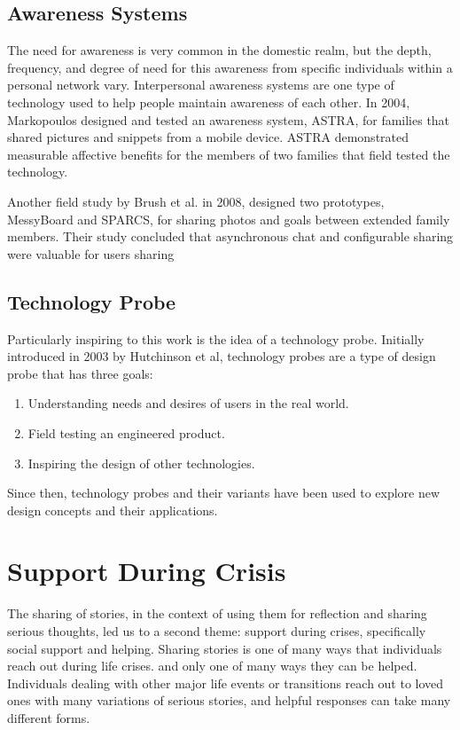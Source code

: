   \subsection{Awareness Systems}
    The need for awareness is very common in the domestic realm,
    but the depth, frequency, and degree of need for this awareness from specific individuals
    within a personal network vary.
    \cite{neustaedter06}
    Interpersonal awareness systems are one type of technology used to
    help people maintain awareness of each other.
    In 2004, Markopoulos designed and tested an
    awareness system, ASTRA, for families that shared pictures and snippets from a mobile
    device.
    \cite{markopoulos04}
    ASTRA demonstrated measurable affective benefits for the members of
    two families that field tested the technology.

    Another field study by Brush et al. in 2008,
    designed two prototypes, MessyBoard and SPARCS,
    for sharing photos and goals between extended family members.
    \cite{brush_08}
    Their study concluded that asynchronous chat and configurable sharing were
    valuable for users sharing 

  \subsection{Technology Probe}
    Particularly inspiring to this work is the idea of a technology probe.
    Initially introduced in 2003 by Hutchinson et al,
    technology probes are a type of design probe that has three goals:
    \begin{enumerate}
    \item Understanding needs and desires of users in the real world.
    \item Field testing an engineered product.
    \item Inspiring the design of other technologies.
    \end{enumerate}

    Since then, technology probes and their variants have been used to explore
    new design concepts and their applications. \cite{vetere05, lottridge09}

\section{Support During Crisis}
  The sharing of stories,
  in the context of using them for reflection and sharing serious thoughts,
  led us to a second theme:
  support during crises,
  specifically social support and helping.
  Sharing stories is one of many ways that
  individuals reach out during life crises.
  and only one of many ways they can be helped.
  Individuals dealing with other major life events or transitions
  reach out to loved ones with many variations of serious stories,
  and helpful responses can take many different forms.

